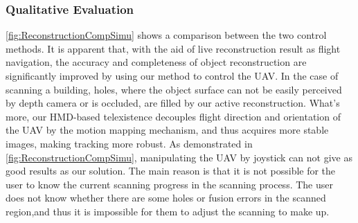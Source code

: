 \documentclass[journal]{IEEEtran}
\begin{document}
\subsubsection{Qualitative Evaluation}
\autoref{fig:ReconstructionCompSimu} shows a comparison between the two control methods. It is apparent 
that, with the aid of live reconstruction result as flight navigation, the accuracy and completeness 
of object reconstruction are significantly improved by using our method to control the UAV. In the case of scanning a building, holes, where the 
object surface can not be easily perceived by depth camera or is occluded, are filled by our active 
reconstruction. What’s more, our HMD-based telexistence decouples flight direction and orientation of 
the UAV by the motion mapping mechanism, and thus acquires more stable images, making 
tracking more robust. As 
demonstrated in \autoref{fig:ReconstructionCompSimu}, manipulating the UAV by joystick can not give as good results as our solution. The main reason is that it is not possible for the user to know the current scanning progress in the scanning process. The user does not know whether there are some holes or fusion errors in the scanned region,and thus it is impossible for them to adjust the scanning to make up.






\end{document}
